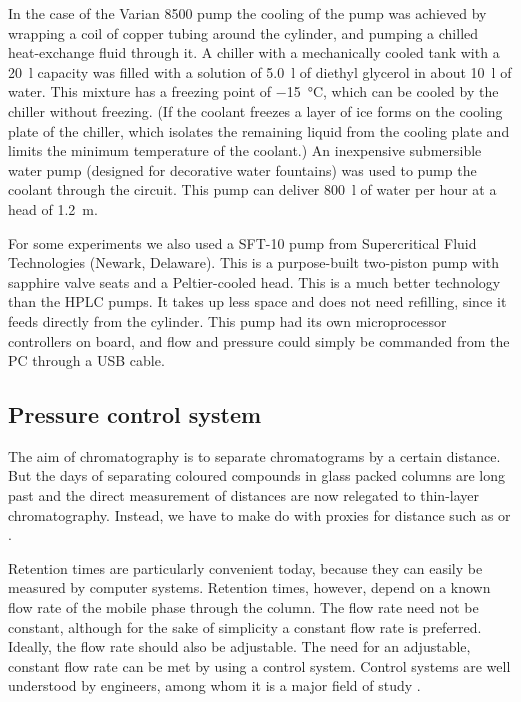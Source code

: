 In the case of the Varian 8500 pump the cooling of the pump was achieved by
wrapping a coil of copper tubing around the cylinder, and pumping a chilled
heat-exchange fluid through it. A chiller with a mechanically cooled tank with a
\SI{20}{\litre} capacity was filled with a solution of \SI{5.0}{\litre} of
diethyl glycerol in about \SI{10}{\litre} of water. This mixture has a freezing
point of \SI{-15}{\celsius}, which can be cooled by the chiller without
freezing. (If the coolant freezes a layer of ice forms on the cooling plate of
the chiller, which isolates the remaining liquid from the cooling plate and
limits the minimum temperature of the coolant.) An inexpensive submersible water
pump (designed for decorative water fountains) was used to pump the coolant
through the circuit. This pump can deliver \SI{800}{\litre} of water per hour at
a head of \SI{1.2}{\metre}.

For some experiments we also used a SFT-10 pump from Supercritical Fluid
Technologies (Newark, Delaware). This is a purpose-built two-piston pump with
sapphire valve seats and a Peltier-cooled head. This is a much better technology
than the HPLC pumps. It takes up less space and does not need refilling, since
it feeds directly from the cylinder. This pump had its own microprocessor
controllers on board, and flow and pressure could simply be commanded from the
PC through a USB cable.

\subsection{Pressure control system}

The aim of chromatography is to separate chromatograms by a certain distance.
But the days of separating coloured compounds in glass packed columns are long
past and the direct measurement of distances are now relegated to thin-layer
chromatography. Instead, we have to make do with proxies for distance such as
 or .



Retention times are particularly convenient today, because they can easily be
measured by computer systems. Retention times, however, depend on a known flow
rate of the mobile phase through the column. The flow rate need not be constant,
although for the sake of simplicity a constant flow rate is preferred. Ideally,
the flow rate should also be adjustable. The need for an adjustable, constant
flow rate can be met by using a control system. Control systems are well
understood by engineers, among whom it is a major field of study
\autocite{Koenig2009}.

